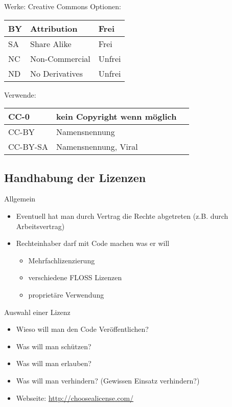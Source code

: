 \begin{frame}{Werke: Creative Commons}
	Optionen:\\
	\begin{tabular}{|l|l|l|}
		\hline
		BY	& Attribution		& Frei\\
		\hline
		SA	& Share Alike		& Frei\\
		\hline
		NC	& Non-Commercial	& Unfrei\\
		\hline
		ND	& No Derivatives	& Unfrei\\
		\hline
	\end{tabular} 
	
	Verwende:\\
	\begin{tabular}{|l|l|l|}
		\hline
		CC-0		& kein Copyright wenn möglich\\
		\hline
		CC-BY		& Namensnennung\\
		\hline
		CC-BY-SA	& Namensnennung, Viral\\
		\hline
	\end{tabular} 
\end{frame}

\subsection{Handhabung der Lizenzen}

\begin{frame}{Allgemein}
	\begin{itemize}
		\item Eventuell hat man durch Vertrag die Rechte abgetreten (z.B. durch Arbeitsvertrag)
		\item Rechteinhaber darf mit Code machen was er will
		\begin{itemize}
			\item Mehrfachlizenzierung
			\item verschiedene FLOSS Lizenzen
			\item proprietäre Verwendung
		\end{itemize}
	\end{itemize}
\end{frame}

\begin{frame}{Auswahl einer Lizenz}
	\begin{itemize}
		\item Wieso will man den Code Veröffentlichen?
		\item Was will man schützen?
		\item Was will man erlauben?
		\item Was will man verhindern? (Gewissen Einsatz verhindern?)
		\item Webseite: \url{http://choosealicense.com/}
	\end{itemize}
\end{frame}

